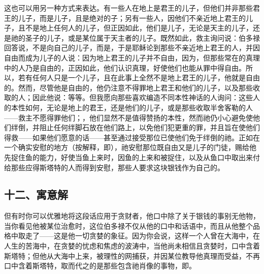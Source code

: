 这也可以用另一种方式来表达。有一些人在地上是君王的儿子，但他们并非那些君王的儿子，而是儿子，且是绝对的子；另有一些人，因他们不亲近地上君王的儿子，且不是地上任何人的儿子，但正因如此，他们是儿子，无论是天主的儿子，还是祂的圣子的儿子，或是某位属于天主者的儿子。既然如此，救主询问说：伯多禄回答说，不是向自己的儿子，而是，于是耶稣论到那些不亲近地上君王的人，并因自由而成为儿子的人说：因为地上君王的儿子并不自由，因为，但那些常在的真理中的人乃是自由的，正因如此，他们认识真理，好使他们也能从罪中得自由。所以，若有任何人只是一个儿子，且在此事上全然不是地上君王的儿子，他就是自由的。然而，尽管他是自由的，他仍注意不得罪地上君王和他们的儿子，以及那些收取的人；因此他说：等等。但我愿向那些喜欢编造不同本性神话的人询问：这些人的本性如何，无论是地上的君王，还是他们的儿子，或是那些收取半舍客勒的人——救主不愿得罪他们；，他们显然不是值得赞扬的本性，然而祂仍小心避免使他们绊倒，并阻止任何绊脚石放在他们路上，以免他们犯更重的罪，并且旨在使他们得救——如果他们愿意的话——甚至通过接受那位已使他们免于绊倒的祂。正如在一个确实安慰的地方（按解释，即），祂安慰那位既自由又是儿子的门徒，赐给他先捉住鱼的能力，好使当鱼上来时，因鱼的上来和被捉住，以及从鱼口中取出来付给那些应得斯塔特的人而得到安慰，那些人要求这块银钱作为自己的。\par


\subsection{十二、寓意解}

但有时你可以优雅地将这段话应用于贪财者，他口中除了关于银钱的事别无他物，当你看见他被某位治愈时，这位伯多禄不仅从他的口中和话语中，而且从他整个品格中取走了——这是他一切贪婪的象征。因为你会说，这样一个人曾在大海中，在人生的苦海中，在贪婪的忧虑和焦虑的波涛中，当他尚未相信且贪婪时，口中含着斯塔特；但他从大海中上来，被理性的网捕获，并因某位教导他真理而受益，不再口中含着斯塔特，取而代之的是那些包含祂肖像的事物，即。\par


